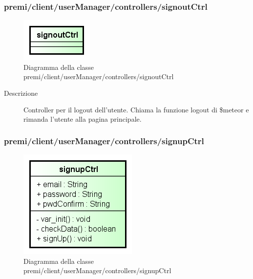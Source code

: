 \subsubsection{premi/client/userManager/controllers/signoutCtrl}
\begin{figure}[h]
\begin{center}
\includegraphics[scale=0.55]{img/diacla/signoutCtrl.png}
\caption{Diagramma della classe premi/client/userManager/controllers/signoutCtrl}
\end{center}
\end{figure}


\begin{description}
\item[Descrizione] \hfill
	Controller per il logout dell'utente. Chiama la funzione logout di \$meteor e rimanda l'utente alla pagina principale.
	
\end{description}





\subsubsection{premi/client/userManager/controllers/signupCtrl}
\begin{figure}[h]
\begin{center}
\includegraphics[scale=0.55]{img/diacla/signupCtrl.png}
\caption{Diagramma della classe premi/client/userManager/controllers/signupCtrl}
\end{center}
\end{figure}


